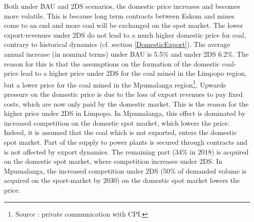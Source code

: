 \documentclass[12pt,english]{article}
\begin{document}
Both under BAU and 2DS scenarios, the domestic price increases and becomes more volatile. This is because long term contracts between Eskom and mines come to an end and more coal will be exchanged on the spot market. The lower export-revenues under 2DS do not lead to a much higher domestic price for coal, contrary to historical dynamics (cf. section \ref{DomesticExport}). The average annual increase (in nominal terms) under BAU is 5.5\% and under 2DS 6.2\%. The reason for this is that the assumptions on the formation of the domestic coal-price lead to a higher price under 2DS for the coal mined in the Limpopo region, but a lower price for the coal mined in the Mpumalanga region\footnote{Source :  private communication with CPI.}. Upwards pressure on the domestic price is due to the loss of export revenues to pay fixed costs, which are now only paid by the domestic market. This is the reason for the higher price under 2DS in Limpopo. In Mpumalanga, this effect is dominated by increased competition  on the domestic spot market, which lowers the price. Indeed, it is assumed that the coal which is not exported, enters the domestic spot market. Part of the supply to power plants is secured through contracts and is not affected by export dynamics. The remaining part (34\% in 2018) is acquired on the domestic spot market, where competition increases under 2DS. In Mpumalanga, the increased competition under 2DS (50\% of demanded volume is acquired on the sport-market by 2030) on the domestic spot market lowers the price. 
\end{document}
